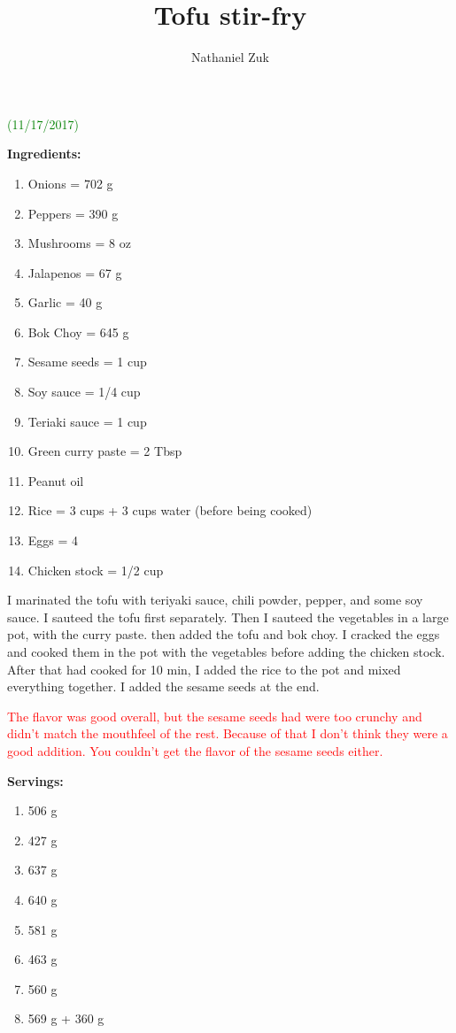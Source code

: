 \usepackage{parskip}
\usepackage{color}

\title{Tofu stir-fry}
\author{Nathaniel Zuk}


\maketitle

\textcolor{green}{(11/17/2017)}

\textbf{Ingredients:}

\begin{enumerate}
\item Onions = 702 g
\item Peppers = 390 g
\item Mushrooms = 8 oz
\item Jalapenos = 67 g
\item Garlic = 40 g
\item Bok Choy = 645 g
\item Sesame seeds = 1 cup
\item Soy sauce = 1/4 cup
\item Teriaki sauce = 1 cup
\item Green curry paste = 2 Tbsp
\item Peanut oil
\item Rice = 3 cups + 3 cups water (before being cooked)
\item Eggs = 4
\item Chicken stock = 1/2 cup
\end{enumerate}

I marinated the tofu with teriyaki sauce, chili powder, pepper, and some soy sauce.  I sauteed the tofu first separately.  Then I sauteed the vegetables in a large pot, with the curry paste.  then added the tofu and bok choy.  I cracked the eggs and cooked them in the pot with the vegetables before adding the chicken stock.  After that had cooked for 10 min, I added the rice to the pot and mixed everything together.  I added the sesame seeds at the end.

\textcolor{red}{The flavor was good overall, but the sesame seeds had were too crunchy and didn't match the mouthfeel of the rest.  Because of that I don't think they were a good addition.  You couldn't get the flavor of the sesame seeds either.}

\textbf{Servings:}
\begin{enumerate}
\item 506 g
\item 427 g
\item 637 g
\item 640 g
\item 581 g
\item 463 g
\item 560 g
\item 569 g + 360 g
\end{enumerate}

